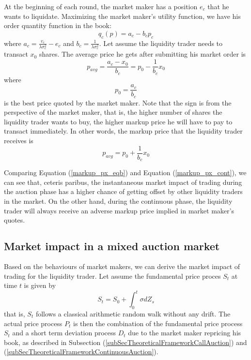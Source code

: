 \documentclass{article}
\begin{document}
At the beginning of each round, the market maker has a position $e_c$ that he wants to liquidate. Maximizing the market maker's utility function, we have his order quantity function in the book:
\[
  q_c(p) = a_c - b_c p_c
\]
where $a_c = \frac{v_c}{\lambda \sigma_c^2} - e_c$ and $b_c=\frac{1}{\lambda \sigma_c^2}$. Let assume the liquidity trader needs to transact $x_0$ shares. The average price he gets after submitting his market order is
\[
  p_{avg} = \frac{a_c-x_0}{b_c}=p_0 - \frac{1}{b_c} x_0
\]
where
\[
  p_0 = \frac{a_c}{b_c}
\]
is the best price quoted by the market maker. Note that the sign is from the perspective of the market maker, that is, the higher number of shares the liquidity trader wants to buy, the higher markup price he will have to pay to transact immediately. In other words, the markup price that the liquidity trader receives is
\begin{equation}\label{markup_px_cont}
  p_{avg} = p_0 + \frac{1}{b_c} x_0
\end{equation}

Comparing Equation (\ref{markup_px_eqb}) and Equation (\ref{markup_px_cont}), we can see that, ceteris paribus, the instantaneous market impact of trading during the auction phase has a higher chance of getting offset by other liquidity traders in the market. On the other hand, during the continuous phase, the liquidity trader will always receive an adverse markup price implied in market maker's quotes.

\subsection{Market impact in a mixed auction market}
Based on the behaviours of market makers, we can derive the market impact of trading for the liquidity trader. Let assume the fundamental price proces $S_t$ at time $t$ is given by
\[
  S_t = S_0 + \int_0^t \sigma dZ_s
\]
that is, $S_t$ follows a classical arithmetic random walk without any drift. The actual price process $P_t$ is then the combination of the fundamental price process $S_t$ and a short term deviation process $D_t$ due to the market maker repricing his book, as described in Subsection (\ref{subSecTheoreticalFrameworkCallAuction}) and (\ref{subSecTheoreticalFrameworkContinuousAuction}). 
\end{document}
